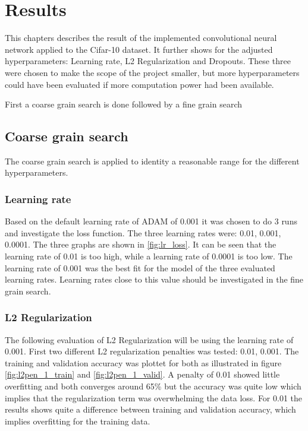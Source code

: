 \chapter{Results}
\label{chp:res}

This chapters describes the result of the implemented convolutional neural network applied to the Cifar-10 dataset. It further shows for the adjusted hyperparameters: Learning rate, L2 Regularization and Dropouts. These three were chosen to make the scope of the project smaller, but more hyperparameters could have been evaluated if more computation power had been available.

First a coarse grain search is done followed by a fine grain search

\section{Coarse grain  search}
The coarse grain search is applied to identity a reasonable range for the different hyperparameters.

\subsection{Learning rate}
Based on the default learning rate of ADAM of 0.001 it was chosen to do 3 runs and investigate the loss function. The three learning rates were: 0.01, 0.001, 0.0001. The three graphs are shown in \ref{fig:lr_loss}. It can be seen that the learning rate of 0.01 is too high, while a learning rate of 0.0001 is too low. The learning rate of 0.001 was the best fit for the model of the three evaluated learning rates. Learning rates close to this value should be investigated in the fine grain search.
	


\subsection{L2 Regularization}
The following evaluation of L2 Regularization will be using the learning rate of 0.001. First two different L2 regularization penalties was tested: 0.01, 0.001.  The training and validation accuracy was plottet for both as illustrated in figure \ref{fig:l2pen_1_train} and \ref{fig:l2pen_1_valid}. A penalty of 0.01 showed little overfitting and both converges around 65\% but the accuracy was quite low which implies that the regularization term was overwhelming the data loss. For 0.01 the results shows quite a difference between training and validation accuracy, which implies overfitting for the training data. 

